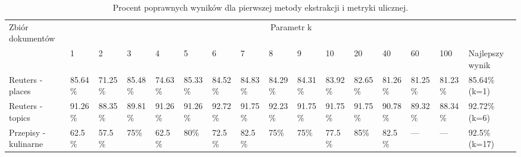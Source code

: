 \documentclass{classrep}
\begin{document}

\begingroup
{\scriptsize  
\setlength{\LTleft}{-20cm plus -1fill}
\setlength{\LTright}{\LTleft}

\begin{longtable}{|p{1cm}|p{0.7cm}|p{0.7cm}|p{0.7cm}|p{0.7cm}|p{0.7cm}|p{0.7cm}|p{0.7cm}|p{0.7cm}|p{0.7cm}|p{0.7cm}|p{0.7cm}|p{0.7cm}|p{0.7cm}|p{0.7cm}|p{1.1cm}|}
\caption{ Procent poprawnych wyników dla pierwszej metody ekstrakcji i metryki ulicznej.}\\ 
\hline

Zbiór
dokumentów

 &\multicolumn{15}{c|}{Parametr k}\\
\cline{2-16}
& 1
& 2
& 3
& 4
& 5
& 6
& 7
& 8
& 9
& 10
& 20
& 40
& 60
& 100
& Najlepszy wynik
\\ \hline\hline
Reuters
- places
& 85.64\%	%
& 71.25\%	%
& 85.48\%	%
& 74.63\%	%
& 85.33\%	%
& 84.52\%	%
& 84.83\%	%
& 84.29\%	%
& 84.31\%	%
& 83.92\%	%
& 82.65\%	%
& 81.26\%	%
& 81.25\%	%
& 81.23\%	%
& 85.64\% (k=1)
\\ \hline
Reuters
- topics
& 91.26\%	%
& 88.35\%	%
& 89.81\%	%
& 91.26\%	%
& 91.26\%	%
& 92.72\%	%
& 91.75\%	%
& 92.23\%	%
& 91.75\%	%
& 91.75\%	%
& 91.75\%	%
& 90.78\%	%
& 89.32\%	%
& 88.34\%	%
& 92.72\%  (k=6)
\\ \hline
Przepisy
- kulinarne 
& 62.5\%	%
& 57.5\%	%
& 75\%		%
& 62.5\%	%
& 80\%		%
& 72.5\%	%
& 82.5\%	%
& 75\%		%
& 75\%		%
& 77.5\%	%
& 85\%		%
& 82.5\%	%
& ---		%
& ---		%
& 92.5\% (k=17)
\\ \hline
\end{longtable}
}
\endgroup



\end{document}
